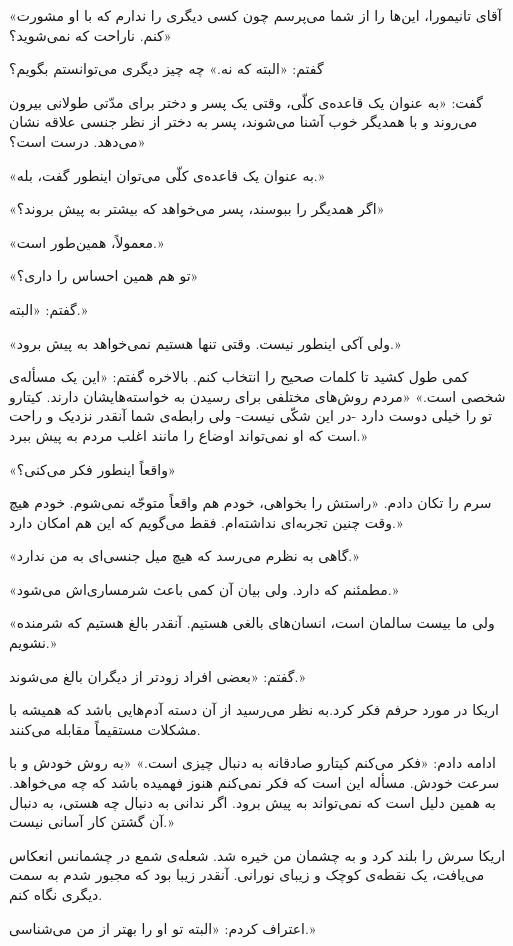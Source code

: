 \documentclass[a5paper]{book}
\begin{document}
«آقای تانیمورا، این‌ها را از شما می‌پرسم چون کسی دیگری را ندارم که با او مشورت کنم. ناراحت که نمی‌شوید؟»

گفتم: «البته که نه.» چه چیز دیگری می‌توانستم بگویم؟

گفت: «به عنوان یک قاعده‌ی کلّی، وقتی یک پسر و دختر برای مدّتی طولانی بیرون می‌روند و با همدیگر خوب آشنا می‌شوند، پسر به دختر از نظر جنسی علاقه نشان می‌دهد. درست است؟»

«به عنوان یک قاعده‌ی کلّی می‌توان اینطور گفت، بله.»

«اگر همدیگر را ببوسند، پسر می‌خواهد که بیشتر به پیش بروند؟»

«معمولاً، همین‌طور است.»

«تو هم همین احساس را داری؟»

گفتم: «البته.»

«ولی آکی اینطور نیست. وقتی تنها هستیم نمی‌خواهد به پیش برود.»

کمی طول کشید تا کلمات صحیح را انتخاب کنم. بالاخره گفتم: «این یک مسأله‌ی شخصی است.» «مردم روش‌های مختلفی برای رسیدن به خواسته‌هایشان دارند. کیتارو تو را خیلی دوست دارد -در این شکّی نیست- ولی رابطه‌ی شما آنقدر نزدیک و راحت است که او نمی‌تواند اوضاع را مانند اغلب مردم به پیش ببرد.»

«واقعاً اینطور فکر می‌کنی؟»

سرم را تکان دادم. «راستش را بخواهی، خودم هم واقعاً متوجّه نمی‌شوم. خودم هیچ وقت چنین تجربه‌ای نداشته‌ام. فقط می‌گویم که این هم امکان دارد.»

«گاهی به نظرم می‌رسد که هیچ میل جنسی‌ای به من ندارد.»

«مطمئنم که دارد. ولی بیان آن کمی باعث شرمساری‌اش می‌شود.»

«ولی ما بیست سالمان است، انسان‌های بالغی هستیم. آنقدر بالغ هستیم که شرمنده نشویم.»

گفتم: «بعضی افراد زودتر از دیگران بالغ می‌شوند.»

اریکا در مورد حرفم فکر کرد.به نظر می‌رسید از آن دسته آدم‌هایی باشد که همیشه با مشکلات مستقیماً مقابله می‌کنند.

ادامه دادم: «فکر می‌کنم کیتارو صادقانه به دنبال چیزی است.» «به روش خودش و با سرعت خودش. مسأله این است که فکر نمی‌کنم هنوز فهمیده باشد که چه می‌خواهد. به همین دلیل است که نمی‌تواند به پیش برود. اگر ندانی به دنبال چه هستی، به دنبال آن گشتن کار آسانی نیست.»

اریکا سرش را بلند کرد و به چشمان من خیره شد. شعله‌ی شمع در چشمانس انعکاس می‌یافت، یک نقطه‌ی کوچک و زیبای نورانی. آنقدر زیبا بود که مجبور شدم به سمت دیگری نگاه کنم.

اعتراف کردم: «البته تو او را بهتر از من می‌شناسی.»
\end{document}
